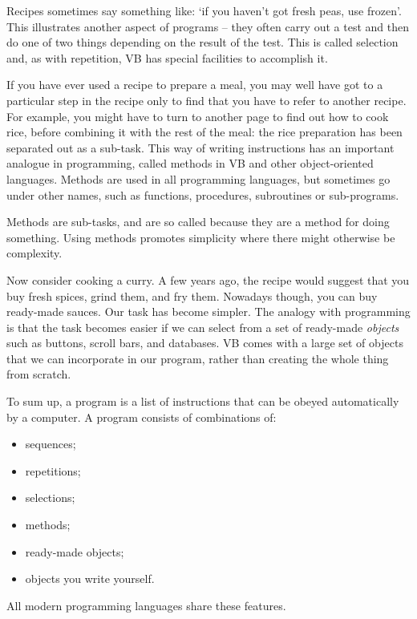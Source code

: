 		Recipes sometimes say something like: ‘if you haven’t got fresh peas, use frozen’. This illustrates another aspect of programs – they often carry out a test and then do one of two things depending on the result of the test. This is called selection and, as with repetition, VB has special facilities to accomplish it.
		
		If you have ever used a recipe to prepare a meal, you may well have got to a particular step in the recipe only to find that you have to refer to another recipe. For example, you might have to turn to another page to find out how to cook rice, before combining it with the rest of the meal: the rice preparation has been separated out as a sub-task. This way of writing instructions has an important analogue in programming, called methods in VB and other object-oriented languages. Methods are used in all programming languages, but sometimes go under other names, such as functions, procedures, subroutines or sub-programs.

		Methods are sub-tasks, and are so called because they are a method for doing something. Using methods promotes simplicity where there might otherwise be complexity.

		Now consider cooking a curry. A few years ago, the recipe would suggest that you buy fresh spices, grind them, and fry them. Nowadays though, you can buy ready-made sauces. Our task has become simpler. The analogy with programming is that the task becomes easier if we can select from a set of ready-made \emph{objects} such as buttons, scroll bars, and databases. VB comes with a large set of objects that we can incorporate in our program, rather than creating the whole thing from scratch.

		To sum up, a program is a list of instructions that can be obeyed automatically by a computer. A program consists of combinations of:
		\begin{itemize}
			\item	sequences;
			\item	repetitions;
			\item	selections;
			\item	methods;
			\item	ready-made objects;
			\item	objects you write yourself.
		\end{itemize}
		All modern programming languages share these features.

